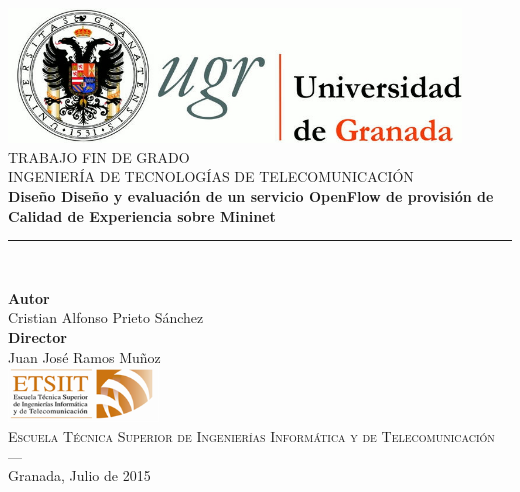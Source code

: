 \begin{titlepage}
 
 
\newlength{\centeroffset}
\setlength{\centeroffset}{-0.5\oddsidemargin}
\addtolength{\centeroffset}{0.5\evensidemargin}
\thispagestyle{empty}

\noindent\hspace*{\centeroffset}\begin{minipage}{\textwidth}

\centering
\includegraphics[width=0.9\textwidth]{imagenes/logo_ugr}\\[1.4cm]

\textsc{ \Large TRABAJO FIN DE GRADO\\[0.2cm]}
\textsc{ INGENIERÍA DE TECNOLOGÍAS DE TELECOMUNICACIÓN}\\[1cm]
% 
{\Huge\bfseries Diseño Diseño y evaluación de un servicio OpenFlow de provisión de Calidad de Experiencia sobre Mininet\\
}
\noindent\rule[-1ex]{\textwidth}{3pt}\\[3.5ex]
{\large\bfseries }
\end{minipage}

\vspace{2.5cm}
\noindent\hspace*{\centeroffset}\begin{minipage}{\textwidth}
\centering

\textbf{Autor}\\ {Cristian Alfonso Prieto Sánchez}\\[2.5ex]
\textbf{Director}\\
{Juan José Ramos Muñoz}\\[2cm]
\includegraphics[width=0.3\textwidth]{imagenes/etsiit_logo}\\[0.1cm]
\textsc{Escuela Técnica Superior de Ingenierías Informática y de Telecomunicación}\\
\textsc{---}\\
Granada, Julio de 2015
\end{minipage}
\end{titlepage}


